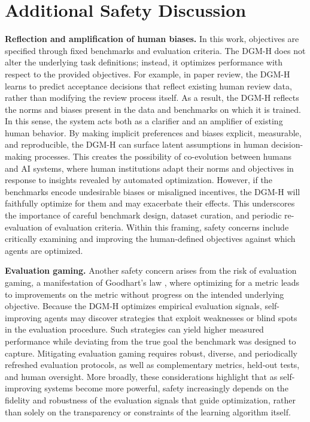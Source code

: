 \documentclass[]{fairmeta}
\newif\ifcomment
\newcommand{\todo}[1]{\textcolor{red}{\ifcomment(\textbf{TODO}: #1)\else\fi}}
\begin{document}



% 

\section{Additional Safety Discussion}
\label{app:safety}

\textbf{Reflection and amplification of human biases.}
In this work, objectives are specified through fixed benchmarks and evaluation criteria. The DGM-H does not alter the underlying task definitions; instead, it optimizes performance with respect to the provided objectives. For example, in paper review, the DGM-H learns to predict acceptance decisions that reflect existing human review data, rather than modifying the review process itself. As a result, the DGM-H reflects the norms and biases present in the data and benchmarks on which it is trained. In this sense, the system acts both as a clarifier and an amplifier of existing human behavior. By making implicit preferences and biases explicit, measurable, and reproducible, the DGM-H can surface latent assumptions in human decision-making processes. This creates the possibility of co-evolution between humans and AI systems, where human institutions adapt their norms and objectives in response to insights revealed by automated optimization. However, if the benchmarks encode undesirable biases or misaligned incentives, the DGM-H will faithfully optimize for them and may exacerbate their effects. This underscores the importance of careful benchmark design, dataset curation, and periodic re-evaluation of evaluation criteria. Within this framing, safety concerns include critically examining and improving the human-defined objectives against which agents are optimized.

\textbf{Evaluation gaming.}
Another safety concern arises from the risk of evaluation gaming, a manifestation of Goodhart's law \citep{strathern1997improving}, where optimizing for a metric leads to improvements on the metric without progress on the intended underlying objective. Because the DGM-H optimizes empirical evaluation signals, self-improving agents may discover strategies that exploit weaknesses or blind spots in the evaluation procedure. Such strategies can yield higher measured performance while deviating from the true goal the benchmark was designed to capture. Mitigating evaluation gaming requires robust, diverse, and periodically refreshed evaluation protocols, as well as complementary metrics, held-out tests, and human oversight. More broadly, these considerations highlight that as self-improving systems become more powerful, safety increasingly depends on the fidelity and robustness of the evaluation signals that guide optimization, rather than solely on the transparency or constraints of the learning algorithm itself.
\end{document}
